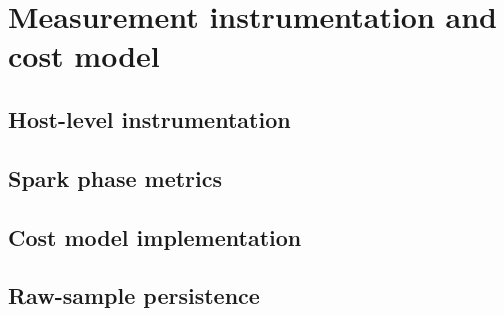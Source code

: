 
\section{Measurement instrumentation and cost model}
\label{system-architecture-and-implementation:measurement-instrumentation-and-cost-model}


\subsection{Host-level instrumentation}
\label{system-architecture-and-implementation:measurement-instrumentation-and-cost-model:host-level-instrumentation}


\subsection{Spark phase metrics}
\label{system-architecture-and-implementation:measurement-instrumentation-and-cost-model:spark-phase-metrics}


\subsection{Cost model implementation}
\label{system-architecture-and-implementation:measurement-instrumentation-and-cost-model:cost-model-implementation}


\subsection{Raw-sample persistence}
\label{system-architecture-and-implementation:measurement-instrumentation-and-cost-model:raw-sample-persistence}

